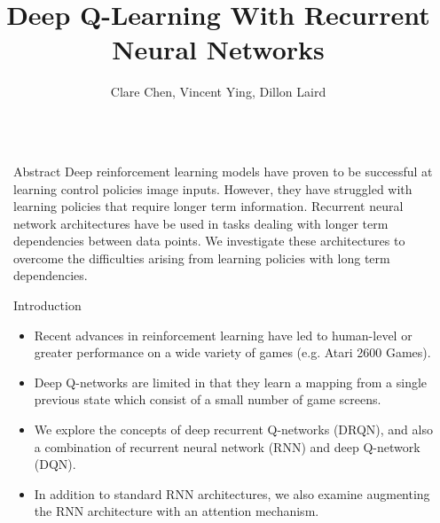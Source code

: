 \documentclass[final]{beamer}
\title{Deep Q-Learning With Recurrent Neural Networks} %
\author{Clare Chen, Vincent Ying, Dillon Laird} %
\institute{Stanford, 2016} %
\newlength{\sepwid}
\newlength{\onecolwid}
\begin{document}

\setlength{\belowcaptionskip}{2ex} %
\setlength\belowdisplayshortskip{2ex} %

\begin{frame}[t] %

\begin{columns}[t] %

\begin{column}{\sepwid}\end{column} %

\begin{column}{\onecolwid} %


\begin{alertblock}{Abstract}
    Deep reinforcement learning models have proven to be successful at learning
    control policies image inputs. However, they have struggled with learning
    policies that require longer term information. Recurrent neural network
    architectures have be used in tasks dealing with longer term dependencies
    between data points. We investigate these architectures to overcome the
    difficulties arising from learning policies with long term dependencies.
\end{alertblock}


\begin{block}{Introduction}
    \begin{itemize}
        \item Recent advances in reinforcement learning have led to human-level
              or greater performance on a wide variety of games (e.g. Atari 2600
              Games). 
        \item Deep Q-networks are limited in that they learn a mapping from a single
              previous state which consist of a small number of game screens.
        \item We explore the concepts of deep recurrent Q-networks (DRQN),
              and also a combination of recurrent neural network (RNN) and deep
              Q-network (DQN).
        \item In addition to standard RNN architectures, we also examine augmenting the RNN
              architecture with an attention mechanism. 
    \end{itemize}
\end{block}


\end{column}
\end{columns}
\end{frame}
\end{document}

